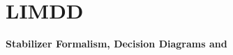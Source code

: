 \section{LIMDD}


\begin{frame}
\begin{refsection}

\vfill
	
	\centering
	\textbf{\Large Stabilizer Formalism, Decision Diagrams and \limdd~\cite{limdd}}
	
	
\vfill

\printbibliography[section=\therefsection]
\end{refsection}

\end{frame}




